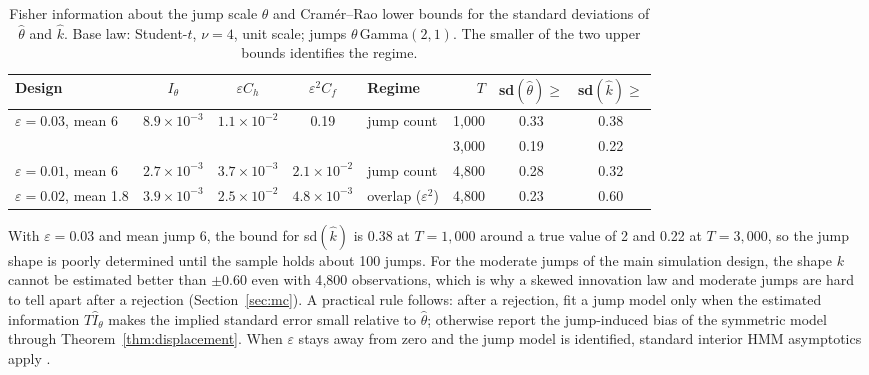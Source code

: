 \documentclass[11pt,a4paper]{article}
\theoremstyle{definition}
\theoremstyle{remark}
\begin{document}
\begin{table}[ht]\centering\footnotesize\setlength{\tabcolsep}{4pt}
\caption{Fisher information about the jump scale $\theta$ and Cram\'er--Rao lower bounds for the standard deviations of $\hat\theta$ and $\hat k$. Base law: Student-$t$, $\nu=4$, unit scale; jumps $\theta\,$Gamma$(2,1)$. The smaller of the two upper bounds identifies the regime.}\label{tab:crb}
\begin{tabular}{lccclrcc}
\toprule
Design & $I_\theta$ & $\varepsilon C_h$ & $\varepsilon^2C_f$ & Regime & $T$ & sd$(\hat\theta)\ge$ & sd$(\hat k)\ge$\\
\midrule
$\varepsilon=0.03$, mean 6 & $8.9\times10^{-3}$ & $1.1\times10^{-2}$ & 0.19 & jump count & 1{,}000 & 0.33 & 0.38\\
 & & & & & 3{,}000 & 0.19 & 0.22\\
$\varepsilon=0.01$, mean 6 & $2.7\times10^{-3}$ & $3.7\times10^{-3}$ & $2.1\times10^{-2}$ & jump count & 4{,}800 & 0.28 & 0.32\\
$\varepsilon=0.02$, mean 1.8 & $3.9\times10^{-3}$ & $2.5\times10^{-2}$ & $4.8\times10^{-3}$ & overlap ($\varepsilon^2$) & 4{,}800 & 0.23 & 0.60\\
\bottomrule
\end{tabular}
\end{table}

\noindent With $\varepsilon=0.03$ and mean jump 6, the bound for sd$(\hat k)$ is 0.38 at $T=1{,}000$ around a true value of 2 and 0.22 at $T=3{,}000$, so the jump shape is poorly determined until the sample holds about 100 jumps. For the moderate jumps of the main simulation design, the shape $k$ cannot be estimated better than $\pm0.60$ even with 4{,}800 observations, which is why a skewed innovation law and moderate jumps are hard to tell apart after a rejection (Section~\ref{sec:mc}). A practical rule follows: after a rejection, fit a jump model only when the estimated information $T\hat I_\theta$ makes the implied standard error small relative to $\hat\theta$; otherwise report the jump-induced bias of the symmetric model through Theorem~\ref{thm:displacement}. When $\varepsilon$ stays away from zero and the jump model is identified, standard interior HMM asymptotics apply \citep{douc2004}.
\end{document}
